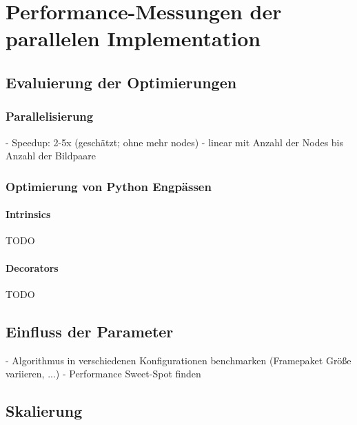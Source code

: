 \chapter{Performance-Messungen der parallelen Implementation}

\section{Evaluierung der Optimierungen}

\subsection{Parallelisierung}

\begin{correctmore}
	- Speedup: 2-5x (geschätzt; ohne mehr nodes)
	- linear mit Anzahl der Nodes bis Anzahl der Bildpaare
\end{correctmore}

\subsection{Optimierung von Python Engpässen}

\subsubsection{Intrinsics}

\begin{correctmore}
	TODO
\end{correctmore}

\subsubsection{Decorators}

\begin{correctmore}
TODO
\end{correctmore}

\section{Einfluss der Parameter}

\begin{correctmore}
	- Algorithmus in verschiedenen Konfigurationen benchmarken (Framepaket Größe variieren, ...)
	- Performance Sweet-Spot finden
\end{correctmore}

\section{Skalierung}

